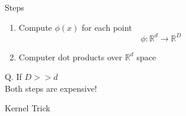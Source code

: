 \documentclass{beamer}
\begin{document}
	\begin{frame}{Steps}
	    \begin{enumerate}
	        \item Compute $\phi(x)$ for each point \\
	        \begin{equation*}
	            \phi: \mathbb{R}^{d} \rightarrow \mathbb{R}^{D}
	        \end{equation*}
	        \item Computer dot products over $\mathbb{R}^{d}$ space
	    \end{enumerate}
	    \hspace{0.1cm} Q. If $D >> d$ \\
	    \hspace{0.6cm} Both steps are expensive!
	\end{frame}
	\begin{frame}{Kernel Trick}
	    
	\end{frame}
	
\end{document}

